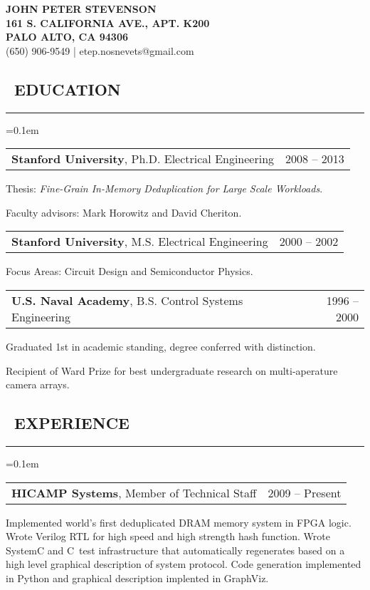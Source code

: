 \documentclass[10pt,letterpaper]{article}
\makeatletter
\newenvironment{changemargin}[2]
{%
    \begin{list}{}{%
        \setlength{\topsep}{0pt}%
        \setlength{\leftmargin}{#1}%
        \setlength{\rightmargin}{#2}%
        \setlength{\listparindent}{\parindent}%
        \setlength{\itemindent}{\parindent}%
        \setlength{\parsep}{\parskip}%
    }%
    \item[]
}%
{%
    \end{list}
}%
\newenvironment{content}
{%
    \begin{changemargin}{0cm}{2.5cm}
    \begin{itemize*}
        \vspace{-0.15em}
}%
{%
    \end{itemize*}
    \end{changemargin}
}%
\newenvironment{resumesection}[1]
{%
    \subsection*{\ #1}
    \vspace{-0.4em}
    \hrule
    \vspace{+0.4em}
    \begin{itemize}
        \parskip=0.1em
}%
{%
    \end{itemize}
}%
\newcommand{\headerrowx}[2]
{\item[] \begin{tabular*}{\linewidth}{l@{\extracolsep{\fill}}r}
	#1 &
	#2 \\
\end{tabular*}}
\newcommand{\CPP}
{C\nolinebreak[4]\hspace{-.05em}\raisebox{.22ex}{\footnotesize\bf +\hspace{-.20em}+}\ }
\makeatother
\begin{document}
\begin{center}
{\LARGE{ \textbf{JOHN PETER STEVENSON}}} \\
\vspace{0.5em}
\footnotesize{\textbf{161 S. CALIFORNIA AVE., APT. K200}}  \\
\footnotesize{\textbf{PALO ALTO, CA 94306              }}  \\
\footnotesize{{(650) 906-9549} | {etep.nosnevets@gmail.com}}
\end{center}

\begin{resumesection}{EDUCATION}
    \headerrowx{ \textbf{Stanford University}, Ph.D. Electrical Engineering} {2008 -- 2013}
    \begin{content}
        \item[] Thesis: \emph{Fine-Grain In-Memory Deduplication for Large Scale Workloads}.
        \item[] Faculty advisors: Mark Horowitz and David Cheriton.
    \end{content}
    
    \headerrowx{ \textbf{Stanford University}, M.S. Electrical Engineering} {2000 -- 2002}
    \begin{content}
    	\item[] Focus Areas: Circuit Design and Semiconductor Physics.
    \end{content}
    
    \headerrowx{ \textbf{U.S. Naval Academy}, B.S. Control Systems Engineering} {1996 -- 2000}
    \begin{content}
    	\item[] Graduated 1st in academic standing, degree conferred with distinction.
    	\item[] Recipient of Ward Prize for best undergraduate research on multi-aperature camera arrays.
    \end{content}
\end{resumesection}

\begin{resumesection}{EXPERIENCE}
    \headerrowx{ \textbf{HICAMP Systems}, Member of Technical Staff} {2009 -- Present}
    \begin{content}
        \item[] Implemented world's first deduplicated DRAM memory system in FPGA logic.
                Wrote Verilog RTL for high speed and high strength hash function.
                Wrote SystemC and \CPP test infrastructure that automatically regenerates based on a high level graphical description of system protocol.
                Code generation implemented in Python and graphical description implented in GraphViz.
    \end{content}
\end{resumesection}
\end{document}
